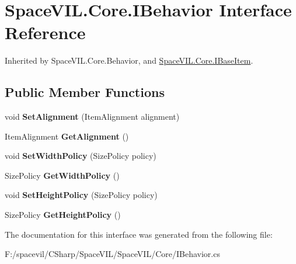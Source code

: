 \hypertarget{interface_space_v_i_l_1_1_core_1_1_i_behavior}{}\section{Space\+V\+I\+L.\+Core.\+I\+Behavior Interface Reference}
\label{interface_space_v_i_l_1_1_core_1_1_i_behavior}


Inherited by Space\+V\+I\+L.\+Core.\+Behavior, and \mbox{\hyperlink{interface_space_v_i_l_1_1_core_1_1_i_base_item}{Space\+V\+I\+L.\+Core.\+I\+Base\+Item}}.

\subsection*{Public Member Functions}
\begin{DoxyCompactItemize}
\item 
\mbox{\label{interface_space_v_i_l_1_1_core_1_1_i_behavior_a1dac2292f28f54b6ab7a543a372ed3ff}} 
void {\bfseries Set\+Alignment} (Item\+Alignment alignment)
\item 
\mbox{\label{interface_space_v_i_l_1_1_core_1_1_i_behavior_a2eebdc8ff7f573ad44fecd38fc3afefe}} 
Item\+Alignment {\bfseries Get\+Alignment} ()
\item 
\mbox{\label{interface_space_v_i_l_1_1_core_1_1_i_behavior_ad05b17fc4495e98d5acecc52ed87ba0f}} 
void {\bfseries Set\+Width\+Policy} (Size\+Policy policy)
\item 
\mbox{\label{interface_space_v_i_l_1_1_core_1_1_i_behavior_acd5152dbc3db861d85ca0b58f6b83f6d}} 
Size\+Policy {\bfseries Get\+Width\+Policy} ()
\item 
\mbox{\label{interface_space_v_i_l_1_1_core_1_1_i_behavior_ad315b5b729f7b94bcfbf5bd85265a7e8}} 
void {\bfseries Set\+Height\+Policy} (Size\+Policy policy)
\item 
\mbox{\label{interface_space_v_i_l_1_1_core_1_1_i_behavior_aa0a8976a19b412f4f1c564a6a9409ca7}} 
Size\+Policy {\bfseries Get\+Height\+Policy} ()
\end{DoxyCompactItemize}


The documentation for this interface was generated from the following file\+:\begin{DoxyCompactItemize}
\item 
F\+:/spacevil/\+C\+Sharp/\+Space\+V\+I\+L/\+Space\+V\+I\+L/\+Core/I\+Behavior.\+cs\end{DoxyCompactItemize}
